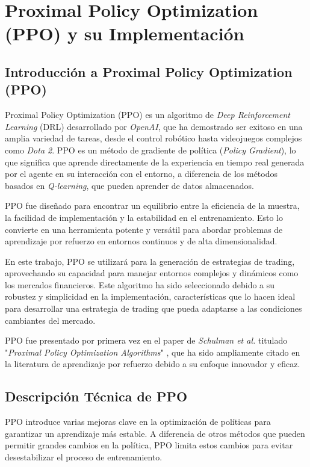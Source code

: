 \documentclass[a4paper,12pt, twoside]{report}
\begin{document}
\section{Proximal Policy Optimization (PPO) y su Implementación}

\subsection{Introducción a Proximal Policy Optimization (PPO)}

Proximal Policy Optimization (PPO) es un algoritmo de \textit{Deep Reinforcement Learning} 
(DRL) desarrollado por \textit{OpenAI}, que ha demostrado ser exitoso en una amplia variedad 
de tareas, desde el control robótico hasta videojuegos complejos como \textit{Dota 2}. 
PPO es un método de gradiente de política (\textit{Policy Gradient}), lo que significa 
que aprende directamente de la experiencia en tiempo real generada por el agente en su 
interacción con el entorno, a diferencia de los métodos basados en \textit{Q-learning}, 
que pueden aprender de datos almacenados.

PPO fue diseñado para encontrar un equilibrio entre la eficiencia de la muestra, la facilidad 
de implementación y la estabilidad en el entrenamiento. Esto lo convierte en una herramienta 
potente y versátil para abordar problemas de aprendizaje por refuerzo en entornos continuos y 
de alta dimensionalidad.

En este trabajo, PPO se utilizará para la generación de estrategias de trading, aprovechando 
su capacidad para manejar entornos complejos y dinámicos como los mercados financieros. Este 
algoritmo ha sido seleccionado debido a su robustez y simplicidad en la implementación, 
características que lo hacen ideal para desarrollar una estrategia de trading que pueda 
adaptarse a las condiciones cambiantes del mercado.

PPO fue presentado por primera vez en el paper de \textit{Schulman et al.} titulado 
"\textit{Proximal Policy Optimization Algorithms}" \cite{Schulman2017}, que ha sido ampliamente 
citado en la literatura de aprendizaje por refuerzo debido a su enfoque innovador y eficaz.

\subsection{Descripción Técnica de PPO}

PPO introduce varias mejoras clave en la optimización de políticas para garantizar un 
aprendizaje más estable. A diferencia de otros métodos que pueden permitir grandes cambios 
en la política, PPO limita estos cambios para evitar desestabilizar el proceso de entrenamiento.
\end{document}
